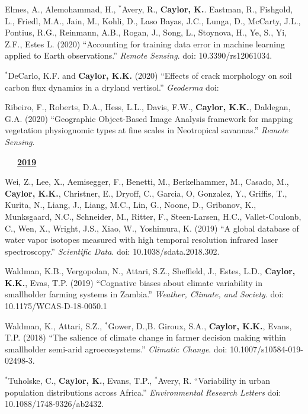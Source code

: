 \documentclass[10pt]{report}
\begin{document}
\begin{etaremune}
\item Elmes, A., Alemohammad, H.,  $^{*}$Avery, R., \textbf{Caylor, K.}. Eastman, R., Fishgold, L., Friedl, M.A., Jain, M., Kohli, D., Laso Bayas, J.C., Lunga, D., McCarty, J.L., Pontius, R.G., Reinmann, A.B., Rogan, J., Song, L., Stoynova, H., Ye, S., Yi, Z.F., Estes L. (2020) ``Accounting for training data error in machine learning applied to Earth observations.'' {\em Remote Sensing}. doi: 10.3390/rs12061034.

\item  $^{*}$DeCarlo, K.F. and \textbf{Caylor, K.K.} (2020) ``Effects of crack morphology on soil carbon flux dynamics in a dryland vertisol.'' {\em Geoderma} doi: 

\item Ribeiro, F., Roberts, D.A., Hess, L.L., Davis, F.W., \textbf{Caylor, K.K.}, Daldegan, G.A. (2020) ``Geographic Object-Based Image Analysis framework for mapping vegetation physiognomic types at fine scales in Neotropical savannas.'' {\em Remote Sensing}. 

\mbox{\ \ \ \underline{\textbf{2019}}}

\item Wei, Z., Lee, X., Aemisegger, F., Benetti, M., Berkelhammer, M., Casado, M., \textbf{Caylor, K.K.}, Christner, E., Dryoff, C., Garcia, O, Gonzalez, Y., Griffis, T., Kurita, N., Liang, J., Liang, M.C., Lin, G., Noone, D., Gribanov, K., Munksgaard, N.C., Schneider, M., Ritter, F., Steen-Larsen, H.C., Vallet-Coulonb, C., Wen, X., Wright, J.S., Xiao, W., Yoshimura, K. (2019) ``A global database of water vapor isotopes measured with high temporal resolution infrared laser spectroscopy.'' {\em Scientific Data}. doi: 10.1038/sdata.2018.302.

\item Waldman, K.B., Vergopolan, N., Attari, S.Z., Sheffield, J., Estes, L.D., \textbf{Caylor, K.K.}, Evas, T.P. (2019) ``Cognative biases about climate variability in smallholder farming systems in Zambia.'' {\em Weather, Climate, and Society}. doi: 10.1175/WCAS-D-18-0050.1

\item Waldman, K., Attari, S.Z., \small $^{*}$Gower, D.,B. Giroux, S.A., \textbf{Caylor, K.K.}, Evans, T.P. (2018) ``The salience of climate change in farmer decision making within smallholder semi-arid agroecosystems.'' {\em Climatic Change}. doi: 10.1007/s10584-019-02498-3.

\item $^{*}$Tuholske, C., \textbf{Caylor, K.}, Evans, T.P., $^{*}$Avery, R. ``Variability in urban population distributions across Africa.'' {\em Environmental Research Letters} doi: 10.1088/1748-9326/ab2432.


\end{etaremune}
\end{document}
